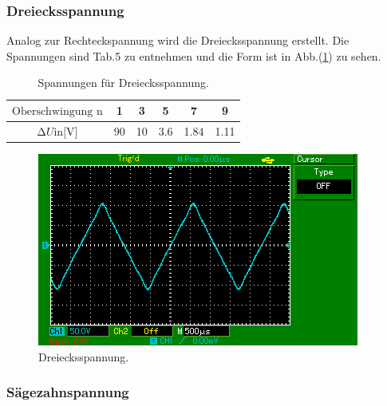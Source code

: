 \subsubsection{Dreiecksspannung}
Analog zur Rechteckspannung wird die Dreiecksspannung erstellt. Die Spannungen
sind Tab.5 zu entnehmen und die Form ist in Abb.(\ref{fig:dreie}) zu sehen.
\begin{table}[h]
  \centering
  \label{tab:5}
  \begin{tabular}{ c c c c c c }
    \toprule
   $ \text{Oberschwingung n} $ & 1 & 3 & 5 & 7 & 9 \\
    \midrule
   $\increment{U} \text{in[V]}$ &90 & 10 &3.6 &1.84 & 1.11 \\
    \bottomrule
  \end{tabular}
  \caption{Spannungen für Dreiecksspannung.}
\end{table}
\begin{figure}[H]
  \centering
  \includegraphics{content/images/dreieck.png}
  \caption{Dreiecksspannung.}
  \label{fig:dreie}
\end{figure}
\subsubsection{Sägezahnspannung}

